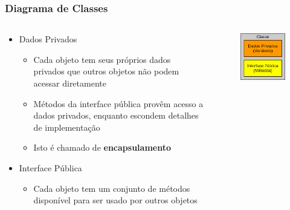\documentclass[xcolor={dvipsnames,table},aspectratio=169]{beamer}
\begin{document}
\begin{frame}\frametitle{Diagrama de Classes}
\begin{columns}[T]
	\begin{column}{0.7\linewidth}
\begin{itemize}
	\item Dados Privados
	\begin{itemize}
		\item Cada objeto tem seus próprios dados privados que outros objetos não podem acessar diretamente
		\item Métodos da interface pública provêm acesso a dados privados, enquanto escondem detalhes de implementação
		\item Isto é chamado de \textbf{encapsulamento}
	\end{itemize}
	\item Interface Pública
	\begin{itemize}
		\item Cada objeto tem um conjunto de métodos disponível para ser usado por outros objetos
	\end{itemize}
\end{itemize}
	\end{column}
	\begin{column}{0.3\linewidth}
\begin{figure}[h]
	\includegraphics[height=0.4\paperheight,center]{pucrs-ep-fprog-unidade_07-objetos_e_classes-laminas-diagrama_de_classes.png}
\end{figure}
	\end{column}
\end{columns}
\end{frame}
\end{document}
